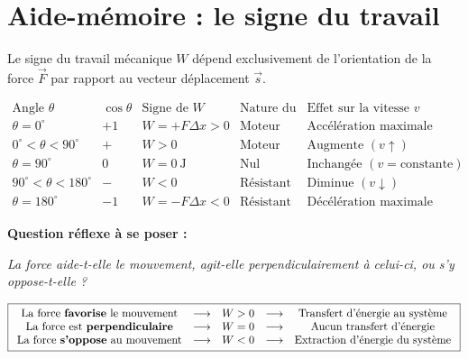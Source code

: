 \documentclass[11pt,openany]{book}
\begin{document}
\section{Aide-mémoire : le signe du travail}

Le signe du travail mécanique $W$ dépend exclusivement de l'orientation de la force $\vec{F}$ par rapport au vecteur déplacement $\vec{s}$. 

\[
\boxed{
\begin{array}{c|c|c|c|c}
\text{Angle } \theta & \cos\theta & \text{Signe de } W & \text{Nature du travail} & \text{Effet sur la vitesse } v \\
\hline
\theta = 0^\circ & +1 & W = +F\Delta x > 0 & \text{Moteur (maximal)} & \text{Accélération maximale} \\
0^\circ < \theta < 90^\circ & + & W > 0 & \text{Moteur} & \text{Augmente } (v \uparrow) \\
\theta = 90^\circ & 0 & W = 0\ \mathrm{J} & \text{Nul} & \text{Inchangée } (v = \text{constante}) \\
90^\circ < \theta < 180^\circ & - & W < 0 & \text{Résistant} & \text{Diminue } (v \downarrow) \\
\theta = 180^\circ & -1 & W = -F\Delta x < 0 & \text{Résistant (maximal)} & \text{Décélération maximale}
\end{array}
}
\]

\begin{important}

\textbf{Question réflexe à se poser :}

\begin{center}
\textit{La force aide-t-elle le mouvement, agit-elle perpendiculairement à celui-ci, ou s'y oppose-t-elle ?}
\end{center}

\[
\boxed{
\begin{array}{ccccc}
\text{La force \textbf{favorise} le mouvement} & \longrightarrow & W > 0 & \longrightarrow & \text{Transfert d'énergie au système} \\
\text{La force est \textbf{perpendiculaire}} & \longrightarrow & W = 0 & \longrightarrow & \text{Aucun transfert d'énergie} \\
\text{La force \textbf{s'oppose} au mouvement} & \longrightarrow & W < 0 & \longrightarrow & \text{Extraction d'énergie du système}
\end{array}
}
\]

\end{important}
\end{document}
